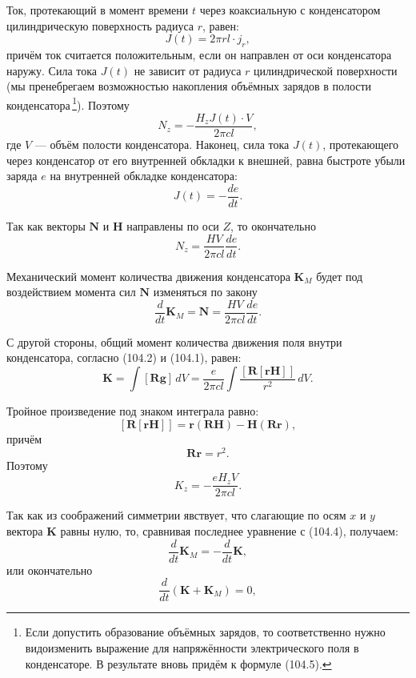 \documentclass[a4paper,10pt]{article}
\begin{document}

Ток, протекающий в момент времени $t$ через коаксиальную с конденсатором
цилиндрическую поверхность радиуса $r$, равен:
$$
    J(t) = 2\pi r l\cdot j_r,
$$
причём ток считается положительным, если он направлен от оси конденсатора
наружу. Сила тока $J(t)$ не зависит от радиуса $r$ цилиндрической
поверхности (мы пренебрегаем возможностью накопления объёмных зарядов
в полости конденсатора\,\footnote{Если допустить образование объёмных
зарядов, то соответственно нужно видоизменить выражение для напряжённости
электрического поля в конденсаторе. В результате вновь придём к формуле
(104.5).}). Поэтому
$$
    N_z = -\frac{H_z J(t)\cdot V}{2\pi cl},
$$
где $V$ — объём полости конденсатора. Наконец, сила тока $J(t)$,
протекающего через конденсатор от его внутренней обкладки к внешней,
равна быстроте убыли заряда $e$ на внутренней обкладке конденсатора:
$$
    J(t) = -\frac{de}{dt}.
$$

Так как векторы $\mathbf{N}$ и $\mathbf{H}$ направлены по оси $Z$, то
окончательно
$$
    N_z = \frac{HV}{2\pi cl}\frac{de}{dt}.
$$

Механический момент количества движения конденсатора $\mathbf{K}_M$
будет под воздействием момента сил $\mathbf{N}$ изменяться по закону
\begin{equation}
    \frac{d}{dt}\mathbf{K}_M = \mathbf{N} = \frac{HV}{2\pi cl}\frac{de}{dt}.
    \tag{104.4}
\end{equation}

С другой стороны, общий момент количества движения поля внутри
конденсатора, согласно (104.2) и (104.1), равен:
$$
    \mathbf{K} = \int[\mathbf{R}\mathbf{g}]\,dV
              = \frac{e}{2\pi cl}\int\frac{[\mathbf{R}[\mathbf{r}\mathbf{H}]]}{r^2}\,dV.
$$

Тройное произведение под знаком интеграла равно:
$$
    [\mathbf{R}[\mathbf{r}\mathbf{H}]] = \mathbf{r}(\mathbf{R}\mathbf{H})
    - \mathbf{H}(\mathbf{R}\mathbf{r}),
$$
причём
$$
    \mathbf{R}\mathbf{r} = r^2.
$$
Поэтому
$$
    K_z = -\frac{eH_z V}{2\pi cl}.
$$


Так как из соображений симметрии явствует, что слагающие по осям
$x$ и $y$ вектора $\mathbf{K}$ равны нулю, то, сравнивая последнее
уравнение с (104.4), получаем:
$$
    \frac{d}{dt}\mathbf{K}_M = -\frac{d}{dt}\mathbf{K},
$$
или окончательно
\begin{equation}
    \frac{d}{dt}(\mathbf{K} + \mathbf{K}_M) = 0,
    \tag{104.5}
\end{equation}
\end{document}

